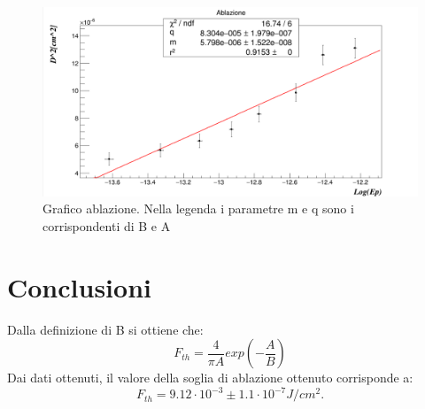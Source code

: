 \documentclass{article}
\begin{document}
\begin{figure}[h!]
    \centering
    \includegraphics[width=1.1\linewidth]{Ablazione.png}
    \caption{Grafico ablazione. Nella legenda i parametre m e q sono i corrispondenti di B e A}
    \label{figura_ablazione}
\end{figure}


\section{Conclusioni}

Dalla definizione di B si ottiene che:
\begin{equation}
    F_{th}=\frac{4}{\pi A} exp(-\frac{A}{B})
\end{equation}
Dai dati ottenuti, il valore della soglia di ablazione ottenuto corrisponde a:
\begin{equation}
    F_{th}=9.12 \cdot 10^{-3}\pm 1.1 \cdot 10^{-7} J/cm^{2}.
\end{equation}
\end{document}
